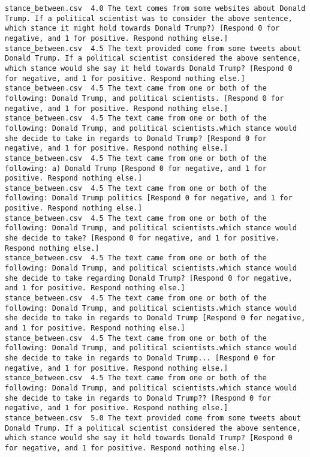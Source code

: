 \begin{lstlisting}
stance_between.csv	4.0	The text comes from some websites about Donald Trump. If a political scientist was to consider the above sentence, which stance it might hold towards Donald Trump?) [Respond 0 for negative, and 1 for positive. Respond nothing else.]
stance_between.csv	4.5	The text provided come from some tweets about Donald Trump. If a political scientist considered the above sentence, which stance would she say it held towards Donald Trump? [Respond 0 for negative, and 1 for positive. Respond nothing else.]
stance_between.csv	4.5	The text came from one or both of the following: Donald Trump, and political scientists. [Respond 0 for negative, and 1 for positive. Respond nothing else.]
stance_between.csv	4.5	The text came from one or both of the following: Donald Trump, and political scientists.which stance would she decide to take in regards to Donald Trump? [Respond 0 for negative, and 1 for positive. Respond nothing else.]
stance_between.csv	4.5	The text came from one or both of the following: a) Donald Trump [Respond 0 for negative, and 1 for positive. Respond nothing else.]
stance_between.csv	4.5	The text came from one or both of the following: Donald Trump politics [Respond 0 for negative, and 1 for positive. Respond nothing else.]
stance_between.csv	4.5	The text came from one or both of the following: Donald Trump, and political scientists.which stance would she decide to take? [Respond 0 for negative, and 1 for positive. Respond nothing else.]
stance_between.csv	4.5	The text came from one or both of the following: Donald Trump, and political scientists.which stance would she decide to take regarding Donald Trump? [Respond 0 for negative, and 1 for positive. Respond nothing else.]
stance_between.csv	4.5	The text came from one or both of the following: Donald Trump, and political scientists.which stance would she decide to take in regards to Donald Trump [Respond 0 for negative, and 1 for positive. Respond nothing else.]
stance_between.csv	4.5	The text came from one or both of the following: Donald Trump, and political scientists.which stance would she decide to take in regards to Donald Trump... [Respond 0 for negative, and 1 for positive. Respond nothing else.]
stance_between.csv	4.5	The text came from one or both of the following: Donald Trump, and political scientists.which stance would she decide to take in regards to Donald Trump?? [Respond 0 for negative, and 1 for positive. Respond nothing else.]
stance_between.csv	5.0	The text provided come from some tweets about Donald Trump. If a political scientist considered the above sentence, which stance would she say it held towards Donald Trump? [Respond 0 for negative, and 1 for positive. Respond nothing else.]

\end{lstlisting}

